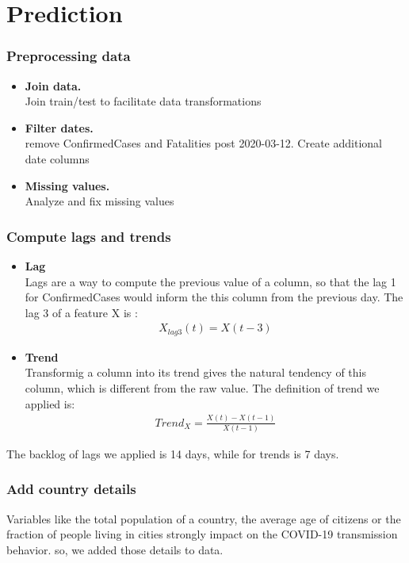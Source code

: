 \documentclass{article}
\begin{document}
\section*{Prediction}
\subsubsection*{Preprocessing data}
\begin{itemize}
\item \textbf{Join data.}\\ Join train/test to facilitate data transformations
\item \textbf{Filter dates.} \\  remove ConfirmedCases and Fatalities post 2020-03-12. Create additional date columns
\item \textbf{Missing values.} \\Analyze and fix missing values
\end{itemize}
\subsubsection*{Compute lags and trends}
\begin{itemize}
\item \textbf{Lag}
\\Lags are a way to compute the previous value of a column, so that the lag 1 for ConfirmedCases would inform the this column from the previous day. The lag 3 of a feature X is :
\begin{align*}
X_{lag3} (t) = X(t - 3)
\end{align*}
\item \textbf{Trend}
\\Transformig a column into its trend gives the natural tendency of this column, which is different from the raw value. The definition of trend we applied is:
\begin{align*}
Trend_X = \frac{X(t) - X(t-1)}{X(t-1)}
\end{align*} 
\end{itemize}
The backlog of lags we applied is 14 days, while for trends is 7 days.
\subsubsection*{Add country details}
Variables like the total population of a country, the average age of citizens or the fraction of people living in cities strongly impact on the COVID-19 transmission behavior. so, we added those details to data.
\end{document}
